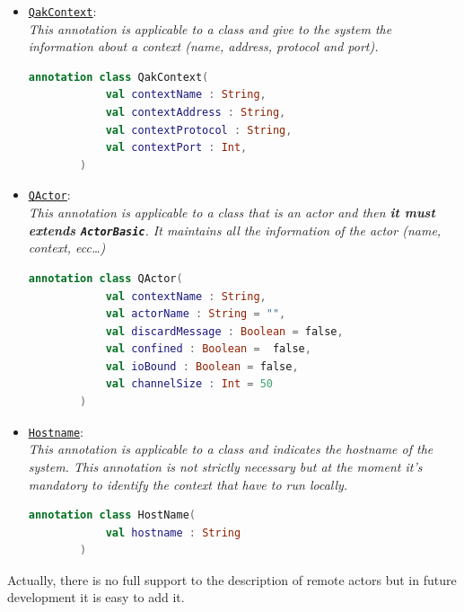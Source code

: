 \begin{itemize}
	\item \href{https://github.com/LM-96/QA-Extensions/blob/main/it.unibo.qakactor/src/main/kotlin/annotations/QakContext.kt}{\textcolor{YellowOrange}{\underline{\texttt{QakContext}}}}:\\
	\textit{This annotation is applicable to a class and give to the system the information about a context (name, address, protocol and port).}
	\begin{lstlisting}[numbers=none,language=Kotlin]
		annotation class QakContext(
			val contextName : String,
			val contextAddress : String,
			val contextProtocol : String,
			val contextPort : Int,
		)
	\end{lstlisting}

	\item \href{https://github.com/LM-96/QA-Extensions/blob/main/it.unibo.qakactor/src/main/kotlin/annotations/QActor.kt}{\textcolor{YellowOrange}{\underline{\texttt{QActor}}}}:\\
	\textit{This annotation is applicable to a class that is an actor and then \textbf{it must extends \texttt{ActorBasic}}. It maintains all the information of the actor (name, context, ecc\dots)}
	\begin{lstlisting}[numbers=none,language=Kotlin]
		annotation class QActor(
			val contextName : String,
			val actorName : String = "",
			val discardMessage : Boolean = false,
			val confined : Boolean =  false,
			val ioBound : Boolean = false,
			val channelSize : Int = 50
		)
	\end{lstlisting}

	\item \href{https://github.com/LM-96/QA-Extensions/blob/main/it.unibo.qakactor/src/main/kotlin/annotations/QakContext.kt}{\textcolor{YellowOrange}{\underline{\texttt{Hostname}}}}:\\
	\textit{This annotation is applicable to a class and indicates the hostname of the system. This annotation is not strictly necessary but at the moment it's mandatory to identify the context that have to run locally.}
	\begin{lstlisting}[numbers=none,language=Kotlin]
		annotation class HostName(
			val hostname : String
		)
	\end{lstlisting}
\end{itemize}

Actually, there is no full support to the description of remote actors but in future development it is easy to add it.

